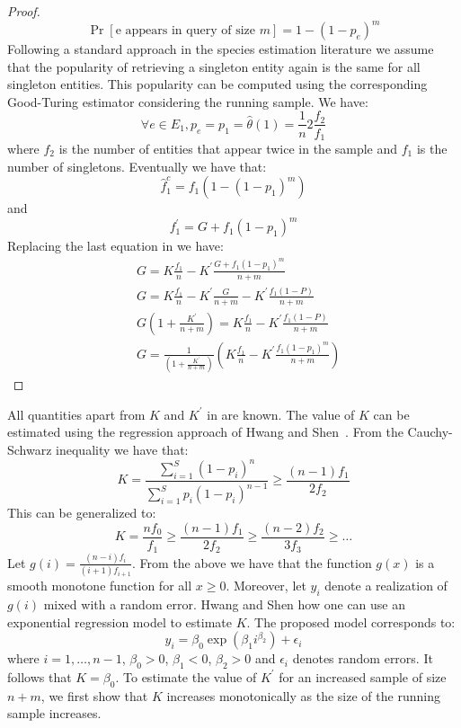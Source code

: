 \begin{proof}
\begin{equation}
\Pr[\mbox{e appears in query of size $m$}] = 1 - (1-p_e)^m
\end{equation}
Following a standard approach in the species estimation literature we assume that the popularity of retrieving a singleton entity again is the same for all singleton entities. This popularity can be computed using the corresponding Good-Turing estimator considering the running sample. We have:
\begin{equation}
\forall e \in E_1, p_e = p_1 = \hat{\theta}(1) = \frac{1}{n}2\frac{f_2}{f_1}
\end{equation}
where $f_2$ is the number of entities that appear twice in the sample and $f_1$ is the number of singletons. 
Eventually we have that:
\begin{equation}
\hat{f}_1^c = f_1(1 - (1-p_1)^m)
\end{equation}
and
\begin{equation}
f^{\prime}_1 = G + f_1(1-p_1)^m
\end{equation}
Replacing the last equation in  we have:
\begin{align}
&G = K\frac{f_1}{n} - K^{\prime}\frac{G + f_1(1-p_1)^m}{n+m} \nonumber \\
&G = K\frac{f_1}{n} - K^{\prime}\frac{G}{n+m} - K^{\prime}\frac{f_1(1- P)}{n+m} \nonumber \\
&G(1 + \frac{K^{\prime}}{n+m}) = K\frac{f_1}{n} - K^{\prime}\frac{f_1(1- P)}{n+m} \nonumber \\
&G = \frac{1}{(1 + \frac{K^{\prime}}{n+m})}(K\frac{f_1}{n} - K^{\prime}\frac{f_1(1-p_1)^m}{n+m}) \nonumber
\end{align}
\end{proof}
\fi
All quantities apart from $K$ and $K^{\prime}$ in  are known. The value of $K$ can be estimated using the regression approach of Hwang and Shen~\cite{hwang:2010}. \iftr From the Cauchy-Schwarz inequality we have that:
\begin{equation}
K = \frac{\sum_{i=1}^S (1-p_i)^n}{\sum_{i=1}^S p_i(1-p_i)^{n-1}} \geq \frac{(n-1)f_1}{2f_2}
\end{equation}
This can be generalized to:
\begin{equation}
K=\frac{nf_0}{f_1} \geq \frac{(n-1)f_1}{2f_2} \geq \frac{(n-2)f_2}{3f_3} \geq \dots
\end{equation}
Let $g(i) = \frac{(n-i)f_i}{(i+1)f_{i+1}}$. From the above we have that the function $g(x)$ is a smooth monotone function for all $x \geq 0$. Moreover, let $y_i$ denote a realization of $g(i)$ mixed with a random error. Hwang and Shen how one can use an exponential regression model to estimate $K$. The proposed model corresponds to:
\begin{equation}
y_i = \beta_0\exp(\beta_1i^{\beta_2}) + \epsilon_i
\end{equation}
where $i = 1, \dots, n-1$, $\beta_0 > 0$, $\beta_1 < 0$, $\beta_2 >0$ and $\epsilon_i$ denotes random errors. It follows that $K = \beta_0$. \fi
To estimate the value of $K^{\prime}$ for an increased sample of size $n+m$, we first show that $K$ increases monotonically as the size of the running sample increases. 

